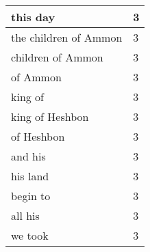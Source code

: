 \begin{center}
\begin{longtable}{|p{3.0in}|p{0.5in}|}
this day & 3\\ \hline 
the children of Ammon & 3\\ \hline 
children of Ammon & 3\\ \hline 
of Ammon & 3\\ \hline 
king of & 3\\ \hline 
king of Heshbon & 3\\ \hline 
of Heshbon & 3\\ \hline 
and his & 3\\ \hline 
his land & 3\\ \hline 
begin to & 3\\ \hline 
all his & 3\\ \hline 
we took & 3\\ \hline 
\end{longtable}
\end{center}





